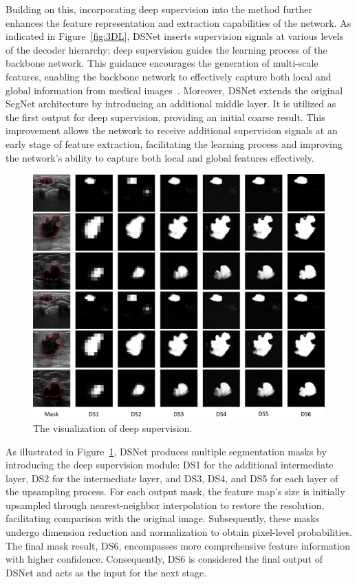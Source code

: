 \documentclass[review]{elsarticle}
\begin{document}
	Building on this, incorporating deep supervision into the method further enhances the feature representation and extraction capabilities of the network. As indicated in Figure~\ref{fig:3DL}, DSNet inserts supervision signals at various levels of the decoder hierarchy; deep supervision guides the learning process of the backbone network. This guidance encourages the generation of multi-scale features, enabling the backbone network to effectively capture both local and global information from medical images~\cite{fu2023deep}. Moreover, DSNet extends the original SegNet architecture by introducing an additional middle layer. It is utilized as the first output for deep supervision, providing an initial coarse result. This improvement allows the network to receive additional supervision signals at an early stage of feature extraction, facilitating the learning process and improving the network's ability to capture both local and global features effectively.
	\begin{figure}[!t]
		\centering
		\begin{adjustwidth}{0cm}{}
			\includegraphics[scale=0.42]{ds.pdf}
		\end{adjustwidth}
		\caption{The visualization of deep supervision.}
		\label{fig:DS}
	\end{figure}
	As illustrated in Figure~\ref{fig:DS}, DSNet produces multiple segmentation masks by introducing the deep supervision module: DS1 for the additional intermediate layer, DS2 for the intermediate layer, and DS3, DS4, and DS5 for each layer of the upsampling process. For each output mask, the feature map's size is initially upsampled through nearest-neighbor interpolation to restore the resolution, facilitating comparison with the original image. Subsequently, these masks undergo dimension reduction and normalization to obtain pixel-level probabilities. The final mask result, DS6, encompasses more comprehensive feature information with higher confidence. Consequently, DS6 is considered the final output of DSNet and acts as the input for the next stage.
\end{document}
